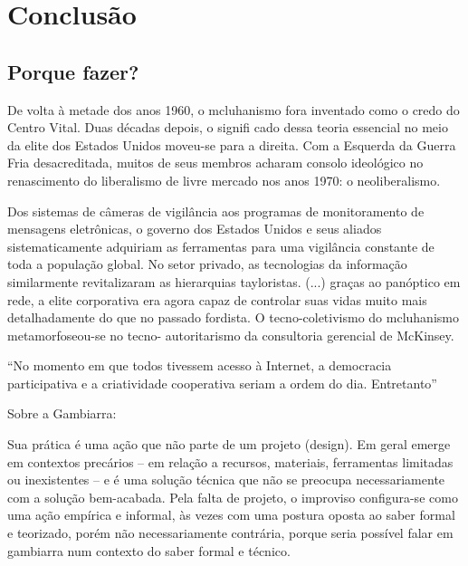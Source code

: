 
\chapter{Conclusão}
\label{ch:conclusao}
\section{Porque fazer?}
\begin{citacao}
De volta à metade dos anos 1960, o mcluhanismo fora inventado
como o credo do Centro Vital. Duas décadas depois, o signifi cado dessa teoria essencial no meio da elite dos Estados Unidos moveu-se para a direita. Com a Esquerda da Guerra Fria desacreditada, muitos de seus membros acharam consolo ideológico no renascimento do liberalismo de livre mercado nos anos 1970: o neoliberalismo.\cite[347]{Barbrook2009}
\end{citacao}

\begin{citacao}
Dos sistemas de câmeras de vigilância aos programas de monitoramento de mensagens eletrônicas, o governo dos Estados Unidos e seus aliados sistematicamente adquiriam as ferramentas para uma vigilância constante de toda a população global. No setor privado, as tecnologias da informação similarmente revitalizaram as hierarquias tayloristas. (...) graças ao panóptico em rede, a elite corporativa era agora capaz de controlar suas vidas muito mais detalhadamente do que no passado fordista. O tecno-coletivismo do mcluhanismo metamorfoseou-se no tecno- autoritarismo da consultoria gerencial de McKinsey. \cite[345]{Barbrook2009}
\end{citacao}

``No momento em que todos tivessem acesso à Internet, a democracia participativa e a criatividade cooperativa seriam a ordem do dia. Entretanto'' \cite[360]{Barbrook2009}


Sobre a Gambiarra:

\begin{citacao}
Sua prática é uma ação que não parte de um projeto (design). Em geral emerge em contextos precários – em relação a recursos, materiais, ferramentas limitadas ou inexistentes – e é uma solução técnica que não se preocupa necessariamente com a solução bem-acabada. Pela falta de projeto, o improviso configura-se como uma ação empírica e informal, às vezes com uma postura oposta ao saber formal e teorizado, porém não necessariamente contrária, porque seria possível falar em gambiarra num contexto do saber formal e técnico. \cite[7]{Obici2014}
\end{citacao}



